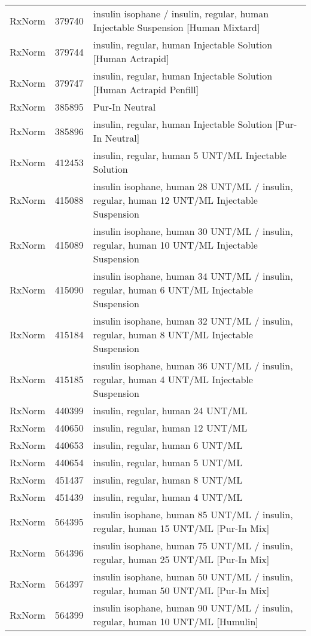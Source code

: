 \begin{longtable}{p{}p{}p{}}
  RxNorm & 379740 & insulin isophane / insulin, regular, human Injectable Suspension [Human Mixtard] \\ 
  RxNorm & 379744 & insulin, regular, human Injectable Solution [Human Actrapid] \\ 
  RxNorm & 379747 & insulin, regular, human Injectable Solution [Human Actrapid Penfill] \\ 
  RxNorm & 385895 & Pur-In Neutral \\ 
  RxNorm & 385896 & insulin, regular, human Injectable Solution [Pur-In Neutral] \\ 
  RxNorm & 412453 & insulin, regular, human 5 UNT/ML Injectable Solution \\ 
  RxNorm & 415088 & insulin isophane, human 28 UNT/ML / insulin, regular, human 12 UNT/ML Injectable Suspension \\ 
  RxNorm & 415089 & insulin isophane, human 30 UNT/ML / insulin, regular, human 10 UNT/ML Injectable Suspension \\ 
  RxNorm & 415090 & insulin isophane, human 34 UNT/ML / insulin, regular, human 6 UNT/ML Injectable Suspension \\ 
  RxNorm & 415184 & insulin isophane, human 32 UNT/ML / insulin, regular, human 8 UNT/ML Injectable Suspension \\ 
  RxNorm & 415185 & insulin isophane, human 36 UNT/ML / insulin, regular, human 4 UNT/ML Injectable Suspension \\ 
  RxNorm & 440399 & insulin, regular, human 24 UNT/ML \\ 
  RxNorm & 440650 & insulin, regular, human 12 UNT/ML \\ 
  RxNorm & 440653 & insulin, regular, human 6 UNT/ML \\ 
  RxNorm & 440654 & insulin, regular, human 5 UNT/ML \\ 
  RxNorm & 451437 & insulin, regular, human 8 UNT/ML \\ 
  RxNorm & 451439 & insulin, regular, human 4 UNT/ML \\ 
  RxNorm & 564395 & insulin isophane, human 85 UNT/ML / insulin, regular, human 15 UNT/ML [Pur-In Mix] \\ 
  RxNorm & 564396 & insulin isophane, human 75 UNT/ML / insulin, regular, human 25 UNT/ML [Pur-In Mix] \\ 
  RxNorm & 564397 & insulin isophane, human 50 UNT/ML / insulin, regular, human 50 UNT/ML [Pur-In Mix] \\ 
  RxNorm & 564399 & insulin isophane, human 90 UNT/ML / insulin, regular, human 10 UNT/ML [Humulin] \\ 

\end{longtable}
